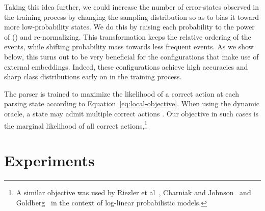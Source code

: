 \documentclass[11pt]{article}
\newcommand{\ignore}[1]{}
\newcommand{\nascomment}[1]{\textcolor{blue}{\textbf{[#1 --\textsc{nas}]}}}
\begin{document}
Taking this idea further, we could increase the number of error-states observed
in the training process by changing the sampling distribution so
as to bias it toward more low-probability states. We do this by raising each
probability to the power of  () and
re-normalizing. 
This transformation keeps the relative ordering of the events, while shifting
probability mass towards less frequent events.  As we show below, this turns out
to be very beneficial for the configurations that make use of external embeddings.
Indeed, these configurations achieve high accuracies and sharp class distributions 
early on in the training process.

The parser is trained to maximize the likelihood of a correct action 
at each parsing state  according to Equation~\ref{eq:local-objective}.  When using the dynamic oracle, a state 
may admit multiple correct actions . Our
objective in such cases is the marginal likelihood of all correct actions,\footnote{A similar objective was used by Riezler et
al~,
Charniak and Johnson~ and Goldberg~ in the
context of log-linear probabilistic models.
}

\ignore{\nascomment{small notational change here to boldsymbol rather than
  mathbf for consistency with what we said in the ``Notation'' section}}

\section{Experiments}
\end{document}
